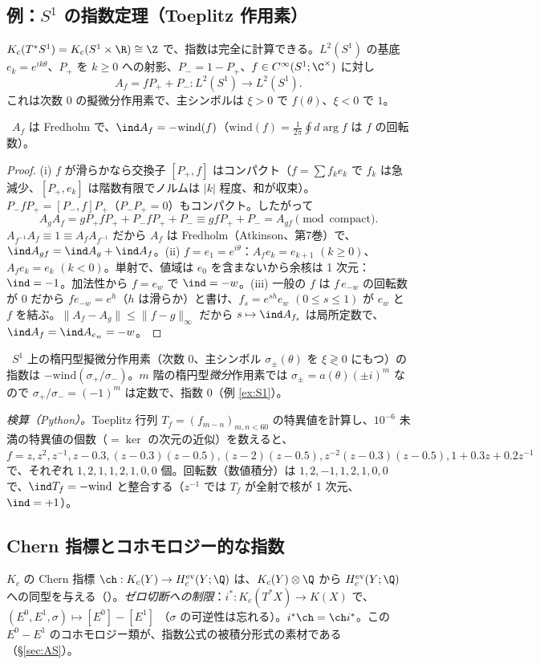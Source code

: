 \subsection{例：$S^1$ の指数定理（Toeplitz 作用素）}\label{subsec:S1index}
$K_c(T^*S^1)=K_c(S^1\times\R)\cong\Z$ で、指数は完全に計算できる。$L^2(S^1)$ の基底 $e_k=e^{ik\theta}$、$P_+$ を $k\ge0$ への射影、$P_-=1-P_+$、$f\in C^\infty(S^1;\C^\times)$ に対し
\[
A_f=fP_++P_-:L^2(S^1)\to L^2(S^1).
\]
これは次数 $0$ の擬微分作用素で、主シンボルは $\xi>0$ で $f(\theta)$、$\xi<0$ で $1$。
\begin{thm}[$S^1$ の指数定理]\label{thm:S1index}\tP\
$A_f$ は Fredholm で、$\ind A_f=-\mathrm{wind}(f)$（$\mathrm{wind}(f)=\frac1{2\pi}\oint d\arg f$ は $f$ の回転数）。
\end{thm}
\begin{proof}
(i) $f$ が滑らかなら交換子 $[P_+,f]$ はコンパクト（$f=\sum f_ke_k$ で $f_k$ は急減少、$[P_+,e_k]$ は階数有限でノルムは $|k|$ 程度、和が収束）。$P_-fP_+=[P_-,f]P_+$（$P_-P_+=0$）もコンパクト。したがって
\[
A_gA_f=gP_+fP_++P_-fP_++P_-\equiv gfP_++P_-=A_{gf}\pmod{\text{compact}}.
\]
$A_{f^{-1}}A_f\equiv1\equiv A_fA_{f^{-1}}$ だから $A_f$ は Fredholm（Atkinson、第7巻）で、$\ind A_{gf}=\ind A_g+\ind A_f$。(ii) $f=e_1=e^{i\theta}$：$A_fe_k=e_{k+1}$ $(k\ge0)$、$A_fe_k=e_k$ $(k<0)$。単射で、値域は $e_0$ を含まないから余核は 1 次元：$\ind=-1$。加法性から $f=e_w$ で $\ind=-w$。(iii) 一般の $f$ は $f\,e_{-w}$ の回転数が $0$ だから $fe_{-w}=e^h$（$h$ は滑らか）と書け、$f_s=e^{sh}e_w$ $(0\le s\le1)$ が $e_w$ と $f$ を結ぶ。$\|A_f-A_g\|\le\|f-g\|_\infty$ だから $s\mapsto\ind A_{f_s}$ は局所定数で、$\ind A_f=\ind A_{e_w}=-w$。
\end{proof}
\begin{cor}\label{cor:S1diff}\tP\
$S^1$ 上の楕円型擬微分作用素（次数 $0$、主シンボル $\sigma_\pm(\theta)$ を $\xi\gtrless0$ にもつ）の指数は $-\mathrm{wind}(\sigma_+/\sigma_-)$。$m$ 階の楕円型\emph{微分}作用素では $\sigma_\pm=a(\theta)(\pm i)^m$ なので $\sigma_+/\sigma_-=(-1)^m$ は定数で、指数 $0$（例 \ref{ex:S1}）。
\end{cor}
\noindent\emph{検算（Python）。}Toeplitz 行列 $T_f=(f_{m-n})_{m,n<60}$ の特異値を計算し、$10^{-6}$ 未満の特異値の個数（$=\ker$ の次元の近似）を数えると、$f=z,z^2,z^{-1},z-0.3,(z-0.3)(z-0.5),(z-2)(z-0.5),z^{-2}(z-0.3)(z-0.5),1+0.3z+0.2z^{-1}$ で、それぞれ $1,2,1,1,2,1,0,0$ 個。回転数（数値積分）は $1,2,-1,1,2,1,0,0$ で、$\ind T_f=-\mathrm{wind}$ と整合する（$z^{-1}$ では $T_f$ が全射で核が 1 次元、$\ind=+1$）。

\subsection{Chern 指標とコホモロジー的な指数}
$K_c$ の Chern 指標 $\ch:K_c(Y)\to H^{\rm ev}_c(Y;\Q)$ は、$K_c(Y)\otimes\Q$ から $H_c^{\rm ev}(Y;\Q)$ への同型を与える（\tC ）。\emph{ゼロ切断への制限}：$i^*:K_c(T^*X)\to K(X)$ で、$(E^0,E^1,\sigma)\mapsto[E^0]-[E^1]$ （$\sigma$ の可逆性は忘れる）。$i^*\ch=\ch i^*$。この $E^0-E^1$ のコホモロジー類が、指数公式の被積分形式の素材である（\S\ref{sec:AS}）。

